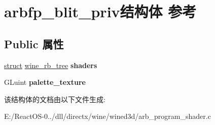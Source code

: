 \hypertarget{structarbfp__blit__priv}{}\section{arbfp\+\_\+blit\+\_\+priv结构体 参考}
\label{structarbfp__blit__priv}
\subsection*{Public 属性}
\begin{DoxyCompactItemize}
\item 
\mbox{\label{structarbfp__blit__priv_a1e87c48570ef63818ce94e2a5f4207a0}} 
\hyperlink{interfacestruct}{struct} \hyperlink{structwine__rb__tree}{wine\+\_\+rb\+\_\+tree} {\bfseries shaders}
\item 
\mbox{\label{structarbfp__blit__priv_a838c3a573ea78f956b83c6f63bb365bf}} 
G\+Luint {\bfseries palette\+\_\+texture}
\end{DoxyCompactItemize}


该结构体的文档由以下文件生成\+:\begin{DoxyCompactItemize}
\item 
E\+:/\+React\+O\+S-\/0../dll/directx/wine/wined3d/arb\+\_\+program\+\_\+shader.\+c\end{DoxyCompactItemize}
